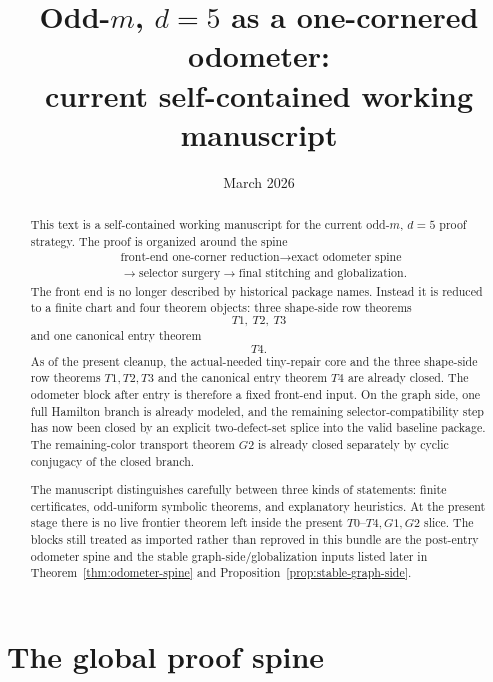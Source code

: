 \documentclass[11pt]{article}
\title{Odd-$m$, $d=5$ as a one-cornered odometer:\\
current self-contained working manuscript}
\author{}
\date{March 2026}
\begin{document}
\maketitle

\begin{abstract}
This text is a self-contained working manuscript for the current odd-$m$,
$d=5$ proof strategy.
The proof is organized around the spine
\[
\begin{aligned}
&\text{front-end one-corner reduction}
\to
\text{exact odometer spine}\\
&\to
\text{selector surgery}
\to
\text{final stitching and globalization}.
\end{aligned}
\]
The front end is no longer described by historical package names.
Instead it is reduced to a finite chart and four theorem objects:
three shape-side row theorems
\[
T1,\ T2,\ T3
\]
and one canonical entry theorem
\[
T4.
\]
As of the present cleanup, the actual-needed tiny-repair core and the three
shape-side row theorems $T1,T2,T3$ and the canonical entry theorem $T4$ are
already closed.  The odometer block after entry is therefore a fixed
front-end input.
On the graph side, one full Hamilton branch is already modeled, and the
remaining selector-compatibility step has now been closed by an explicit
two-defect-set splice into the valid baseline package.  The remaining-color
transport theorem \(G2\) is already closed separately by cyclic conjugacy of the
closed branch.

The manuscript distinguishes carefully between three kinds of statements:
finite certificates, odd-uniform symbolic theorems, and explanatory heuristics.
At the present stage there is no live frontier theorem left inside the present
\(T0\)--\(T4,G1,G2\) slice.  The blocks still treated as imported rather
than reproved in this bundle are the post-entry odometer spine and the
stable graph-side/globalization inputs listed later in
Theorem~\ref{thm:odometer-spine} and Proposition~\ref{prop:stable-graph-side}.
\end{abstract}

\tableofcontents

\section{The global proof spine}
\end{document}
